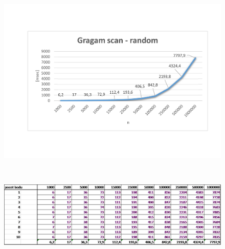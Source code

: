 \documentclass{article}
\begin{document}
\begin{figure}[htbp]
\centering
        \includegraphics[clip, trim=0cm 0cm 0cm 0cm, width=1\textwidth]{gr.pdf}
\end{figure}
\\
\begin{figure}[htbp]
\centering
        \includegraphics[clip, trim=0cm 0cm 0cm 0cm, width=1\textwidth]{gr.png}
\end{figure}
\clearpage
\newpage
\end{document}
